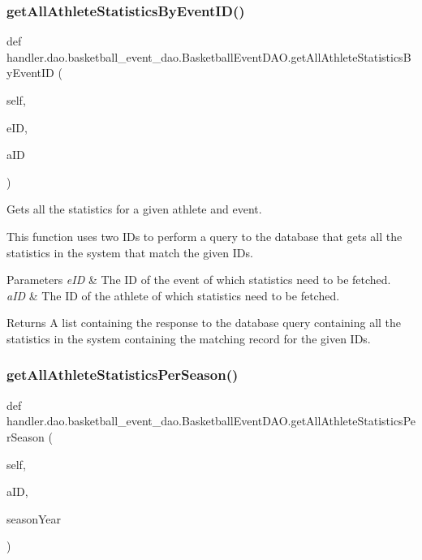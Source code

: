 \subsubsection{\texorpdfstring{get\+All\+Athlete\+Statistics\+By\+Event\+I\+D()}{getAllAthleteStatisticsByEventID()}}
{\footnotesize\ttfamily def handler.\+dao.\+basketball\+\_\+event\+\_\+dao.\+Basketball\+Event\+D\+A\+O.\+get\+All\+Athlete\+Statistics\+By\+Event\+ID (\begin{DoxyParamCaption}\item[{}]{self,  }\item[{}]{e\+ID,  }\item[{}]{a\+ID }\end{DoxyParamCaption})}



Gets all the statistics for a given athlete and event. 

This function uses two I\+Ds to perform a query to the database that gets all the statistics in the system that match the given I\+Ds.


\begin{DoxyParams}{Parameters}
{\em e\+ID} & The ID of the event of which statistics need to be fetched. \\
\hline
{\em a\+ID} & The ID of the athlete of which statistics need to be fetched.\\
\hline
\end{DoxyParams}
\begin{DoxyReturn}{Returns}
A list containing the response to the database query containing all the statistics in the system containing the matching record for the given I\+Ds. 
\end{DoxyReturn}
\mbox{\label{classhandler_1_1dao_1_1basketball__event__dao_1_1_basketball_event_d_a_o_a6344ff81a10cbf1393461dafdd22eb05}} 
\subsubsection{\texorpdfstring{get\+All\+Athlete\+Statistics\+Per\+Season()}{getAllAthleteStatisticsPerSeason()}}
{\footnotesize\ttfamily def handler.\+dao.\+basketball\+\_\+event\+\_\+dao.\+Basketball\+Event\+D\+A\+O.\+get\+All\+Athlete\+Statistics\+Per\+Season (\begin{DoxyParamCaption}\item[{}]{self,  }\item[{}]{a\+ID,  }\item[{}]{season\+Year }\end{DoxyParamCaption})}



